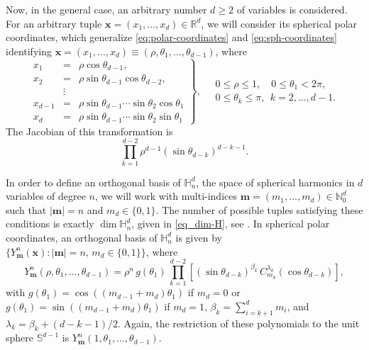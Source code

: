 \documentclass[a4paper]{article}
\theoremstyle{plain}
\theoremstyle{definition}
\newcommand{\NN}{\mathbb{N}}
\newcommand{\RR}{\mathbb{R}}
\begin{document}
    Now, in the general case, an arbitrary number $d\geq 2$ of variables is considered. For an arbitrary tuple $\mathbf{x}=(x_1,\dots,x_d)\in\RR^d$, we will consider its spherical polar coordinates, which generalize \eqref{eq:polar-coordinates} and \eqref{eq:sph-coordinates} identifying $\mathbf x =(x_1,\dots,x_d)\equiv (\rho,\theta_1,\dots,\theta_{d-1})$, where
    \begin{equation}
    \label{eq:sph-coordinates-d}
    \left.\begin{array}{rcl}
         x_1 & = & \rho \cos\theta_{d-1},  \\
         x_2 & = & \rho \sin\theta_{d-1} \cos\theta_{d-2},  \\
          & \vdots &  \\
         x_{d-1} & = &\rho \sin\theta_{d-1}\cdots \sin\theta_2 \cos \theta_1  \\
         x_d &=& \rho \sin\theta_{d-1}\cdots \sin\theta_2 \sin \theta_1
    \end{array}\right\},
    \quad \begin{array}{l}
         0\leq \rho\leq 1, \quad 0\leq\theta_1<2 \pi,  \\
         0\leq \theta_k\leq\pi,\ \ k=2,\dots,d-1 . 
    \end{array} 
    \end{equation}
    The Jacobian of this transformation is 
    \begin{equation}
        \label{eq:jacobian-sph-pol-coordinates}
        \prod_{k=1}^{d-2}\rho^{d-1}(\sin\theta_{d-k})^{d-k-1}.
    \end{equation}

    In order to define an orthogonal basis of $\mathbb H_n^d$, the space of spherical harmonics in $d$ variables of degree $n$, we will work with multi-indices $\mathbf m = (m_1,\dots,m_d)\in\NN^d_0$ such that $|\mathbf m|=n$ and $m_d\in\{0,1\}$. The number of possible tuples satisfying these conditions is exactly $\dim \mathbb H_n^d$, given in \eqref{eq_dim-H}, see \cite[Section 4.1]{DX14}. In spherical polar coordinates, an orthogonal basis of $\mathbb H_n^d$ is given by $\{Y_{\mathbf m}^n(\mathbf x):|\mathbf m|=n,\, m_d\in\{0,1\}\}$, where
    \begin{equation}
    \label{eq:sph-harmonics-d}
        Y_{\mathbf m}^n(\rho,\theta_1,\dots,\theta_{d-1})=\rho^n\, g(\theta_1)\, \prod_{k=1}^{d-2}\left[ (\sin\theta_{d-k})^{\beta_k}\, C_{m_k}^{\lambda_k}(\cos \theta_{d-k}) \right], 
    \end{equation}
    with $g(\theta_1)=\cos((m_{d-1}+m_d)\theta_1)$ if $m_d=0$ or $g(\theta_1)=\sin((m_{d-1}+m_d)\theta_1)$ if $m_d=1$, $\beta_k=\sum_{i=k+1}^d m_i$, and $\lambda_k = \beta_k + (d-k-1)/2$. Again, the restriction of these polynomials to the unit sphere $\mathbb S^{d-1}$ is $Y_{\mathbf m}^n(1,\theta_1,\dots,\theta_{d-1})$.
\end{document}
